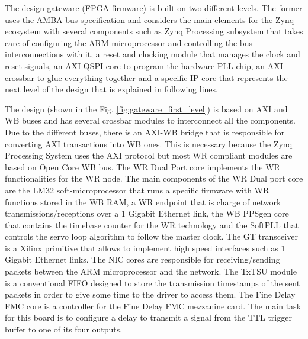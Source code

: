 The design gateware (FPGA firmware) is built on two different levels. The former uses the AMBA bus specification and considers the main elements for the Zynq ecosystem with several components such as Zynq Processing subsystem that takes care of configuring the ARM microprocessor and controlling the bus interconnections with it, a reset and clocking module that manages the clock and reset signals, an AXI QSPI core to program the hardware PLL chip, an AXI crossbar to glue everything together and a specific IP core that represents the next level of the design that is explained in following lines.

The design (shown in the Fig. \ref{fig:gateware_first_level}) is based on AXI and WB buses and has several crossbar modules to interconnect
all the components. Due to the different buses, there is an AXI-WB bridge that is responsible 
for converting AXI transactions into WB ones. This is necessary because the Zynq Processing System 
uses the AXI protocol but most WR compliant modules are based on Open Core WB bus. The WR Dual Port 
core implements the WR functionalities for the WR node. The main components of the WR Dual port core 
are the LM32 soft-microprocessor that runs a specific firmware with WR functions stored in the WB RAM, 
a WR endpoint that is charge of network transmissions/receptions over a 1 Gigabit Ethernet link, 
the WB PPSgen core that contains the timebase counter for the WR technology and the SoftPLL
that controls the servo loop algorithm to follow the master clock. The GT transceiver is a Xilinx primitive
that allows to implement high speed interfaces such as 1 Gigabit Ethernet links. The NIC cores are responsible
for receiving/sending packets between the ARM microprocessor and the network. The TxTSU module is a conventional
FIFO designed to store the transmission timestamps of the sent packets in order to give some time to the driver to
access them. The Fine Delay FMC core is a controller for the Fine Delay FMC mezzanine card. The main task for this 
board is to configure a delay to transmit a signal from the TTL trigger buffer to one of its four outputs.


